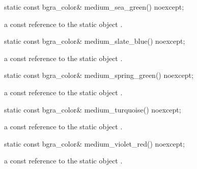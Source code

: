 \begin{itemdecl}
static const bgra_color& medium_sea_green() noexcept;
\end{itemdecl}
\begin{itemdescr}
\pnum
\returns
a const reference to the static  object .
\end{itemdescr}

\begin{itemdecl}
static const bgra_color& medium_slate_blue() noexcept;
\end{itemdecl}
\begin{itemdescr}
\pnum
\returns
a const reference to the static  object .
\end{itemdescr}

\begin{itemdecl}
static const bgra_color& medium_spring_green() noexcept;
\end{itemdecl}
\begin{itemdescr}
\pnum
\returns
a const reference to the static  object .
\end{itemdescr}

\begin{itemdecl}
static const bgra_color& medium_turquoise() noexcept;
\end{itemdecl}
\begin{itemdescr}
\pnum
\returns
a const reference to the static  object .
\end{itemdescr}

\begin{itemdecl}
static const bgra_color& medium_violet_red() noexcept;
\end{itemdecl}
\begin{itemdescr}
\pnum
\returns
a const reference to the static  object .
\end{itemdescr}

